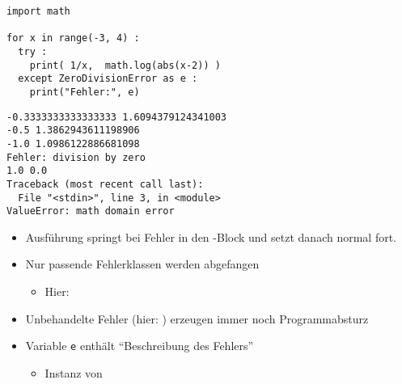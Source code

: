 \begin{frame}[fragile]
%
\begin{tcbraster}[raster columns=2,
                  raster equal height,
                  nobeforeafter,
                  raster column skip=0.5cm]
\begin{codebox}
\begin{verbatim}
import math

for x in range(-3, 4) :
  try :
    print( 1/x,  math.log(abs(x-2)) )
  except ZeroDivisionError as e :
    print("Fehler:", e)
\end{verbatim}
\end{codebox}
%
\begin{cmdbox}
\begin{verbatim}
-0.3333333333333333 1.6094379124341003
-0.5 1.3862943611198906
-1.0 1.0986122886681098
Fehler: division by zero
1.0 0.0
Traceback (most recent call last):
  File "<stdin>", line 3, in <module>
ValueError: math domain error
\end{verbatim}
\end{cmdbox}
\end{tcbraster}
%
\begin{center}
\begin{itemize}
\item[\Thus] Ausführung springt bei Fehler in den -Block und setzt danach normal fort.
\item[\Thus] Nur passende Fehlerklassen werden abgefangen
	\begin{itemize}
	\item[\thus] Hier: 
	\end{itemize}
\item[\Thus] Unbehandelte Fehler (hier: ) erzeugen immer noch Programmabsturz
\item[\Thus] Variable \texttt{e} enthält \enquote{Beschreibung des Fehlers}
	\begin{itemize}
	\item[\thus] Instanz von 
	\end{itemize}
\end{itemize}
\end{center}
%
\end{frame}



